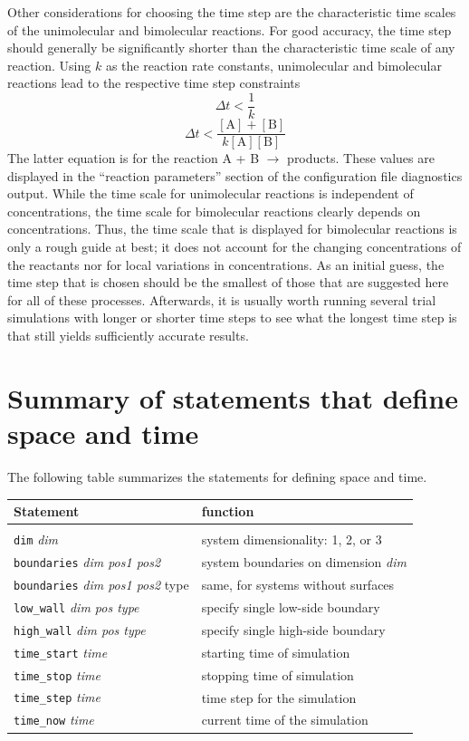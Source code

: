 \documentclass {scrbook}
\newcommand {\ttt} {\texttt}
\newcommand {\param} {\textit}
\begin{document}
Other considerations for choosing the time step are the characteristic time scales of the unimolecular and bimolecular reactions. For good accuracy, the time step should generally be significantly shorter than the characteristic time scale of any reaction. Using $k$ as the reaction rate constants, unimolecular and bimolecular reactions lead to the respective time step constraints
$$\Delta t < \frac{1}{k}$$
$$\Delta t < \frac{[\textrm{A}]+[\textrm{B}]}{k[\textrm{A}][\textrm{B}]}$$
The latter equation is for the reaction A + B $\rightarrow$ products. These values are displayed in the ``reaction parameters'' section of the configuration file diagnostics output. While the time scale for unimolecular reactions is independent of concentrations, the time scale for bimolecular reactions clearly depends on concentrations. Thus, the time scale that is displayed for bimolecular reactions is only a rough guide at best; it does not account for the changing concentrations of the reactants nor for local variations in concentrations.
As an initial guess, the time step that is chosen should be the smallest of those that are suggested here for all of these processes. Afterwards, it is usually worth running several trial simulations with longer or shorter time steps to see what the longest time step is that still yields sufficiently accurate results.

\section{Summary of statements that define space and time}

The following table summarizes the statements for defining space and time.

\begin{longtable}[c]{ll}
Statement & function\\
\hline\\
\ttt{dim} \param{dim} & system dimensionality: 1, 2, or 3\\
\ttt{boundaries} \param{dim pos1 pos2} & system boundaries on dimension \param{dim}\\
\ttt{boundaries} \param{dim pos1 pos2} type & same, for systems without surfaces\\
\ttt{low\_wall} \param{dim pos type} & specify single low-side boundary\\
\ttt{high\_wall} \param{dim pos type} & specify single high-side boundary\\
\ttt{time\_start} \param{time} & starting time of simulation\\
\ttt{time\_stop} \param{time} & stopping time of simulation\\
\ttt{time\_step} \param{time} & time step for the simulation\\
\ttt{time\_now} \param{time} & current time of the simulation
\end{longtable}
\end{document}
